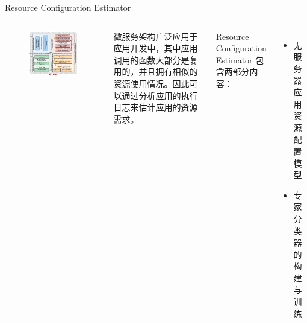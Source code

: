\documentclass[aspectratio=169]{beamer}
\begin{document}
\begin{frame}{Resource Configuration Estimator}\label{label:resource-configuration-estimator}
  \begin{columns}
    \begin{figure}
      \centering
      \includegraphics[scale=1.5]{img/method/resource-configuration-estimator.pdf}
    \end{figure}

    微服务架构广泛应用于应用开发中，其中应用调用的函数大部分是复用的，并且拥有相似的资源使用情况。因此可以通过分析应用的执行日志来估计应用的资源需求。

    Resource Configuration Estimator 包含两部分内容：
    \begin{itemize}
      \item 无服务器应用资源配置模型
      \item 专家分类器的构建与训练
    \end{itemize}
  \end{columns}
  \hfill\hyperlink{label:architecture-1}{}
\end{frame}
\end{document}
